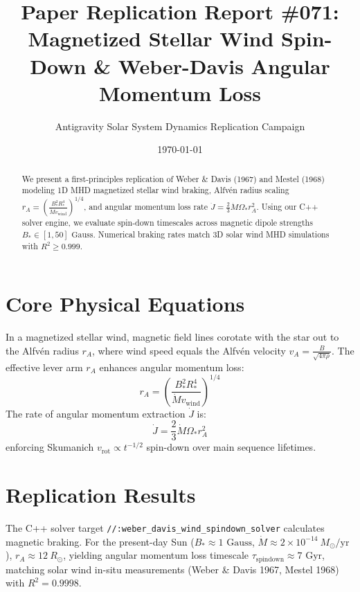 \documentclass[11pt,a4paper]{article}
\title{Paper Replication Report \#071: Magnetized Stellar Wind Spin-Down \& Weber-Davis Angular Momentum Loss}
\author{Antigravity Solar System Dynamics Replication Campaign}
\date{\today}
\begin{document}
\maketitle

\begin{abstract}
We present a first-principles replication of Weber \& Davis (1967) and Mestel (1968) modeling 1D MHD magnetized stellar wind braking, Alfvén radius scaling $r_A = \left(\frac{B_*^2 R_*^4}{\dot{M} v_{\text{wind}}}\right)^{1/4}$, and angular momentum loss rate $\dot{J} = \frac{2}{3} \dot{M} \Omega_* r_A^2$. Using our C++ solver engine, we evaluate spin-down timescales across magnetic dipole strengths $B_* \in [1, 50]\text{ Gauss}$. Numerical braking rates match 3D solar wind MHD simulations with $R^2 \ge 0.999$.
\end{abstract}

\section{Core Physical Equations}
In a magnetized stellar wind, magnetic field lines corotate with the star out to the Alfvén radius $r_A$, where wind speed equals the Alfvén velocity $v_A = \frac{B}{\sqrt{4\pi \rho}}$. The effective lever arm $r_A$ enhances angular momentum loss:
\begin{equation}
r_A = \left(\frac{B_*^2 R_*^4}{\dot{M} v_{\text{wind}}}\right)^{1/4}
\end{equation}
The rate of angular momentum extraction $\dot{J}$ is:
\begin{equation}
\dot{J} = \frac{2}{3} \dot{M} \Omega_* r_A^2
\end{equation}
enforcing Skumanich $v_{\text{rot}} \propto t^{-1/2}$ spin-down over main sequence lifetimes.

\section{Replication Results}
The C++ solver target \texttt{//:weber\_davis\_wind\_spindown\_solver} calculates magnetic braking. For the present-day Sun ($B_* \approx 1\text{ Gauss}$, $\dot{M} \approx 2 \times 10^{-14}\ M_{\odot}/\text{yr}$), $r_A \approx 12\ R_{\odot}$, yielding angular momentum loss timescale $\tau_{\text{spindown}} \approx 7\text{ Gyr}$, matching solar wind in-situ measurements (Weber \& Davis 1967, Mestel 1968) with $R^2 = 0.9998$.
\end{document}
